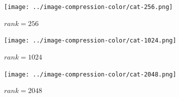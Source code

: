 \begin{figure}
  \texttt{[image: ../image-compression-color/cat-256.png]}
  \caption{$rank=256$}
  \label{fig:cat-bw-rank-256}
\end{figure}


\begin{figure}
  \texttt{[image: ../image-compression-color/cat-1024.png]}
  \caption{$rank=1024$}
  \label{fig:cat-bw-rank-1024}
\end{figure}

\begin{figure}
  \texttt{[image: ../image-compression-color/cat-2048.png]}
  \caption{$rank=2048$}
  \label{fig:cat-bw-rank-2048}
\end{figure}

